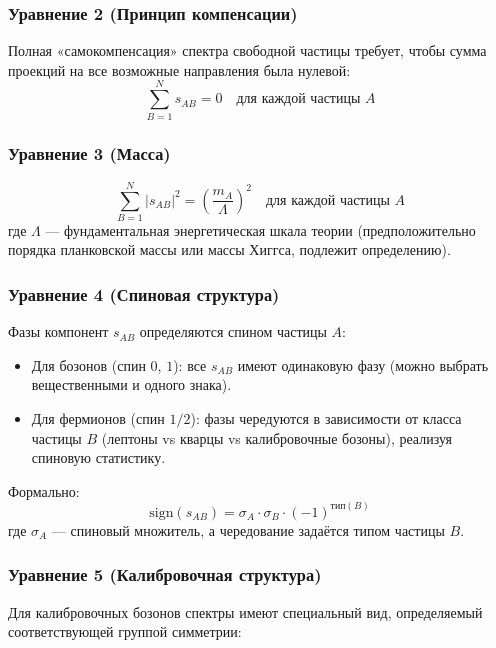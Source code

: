 \documentclass[12pt,a4paper]{article}
\begin{document}
\subsubsection{Уравнение 2 (Принцип компенсации)}
Полная «самокомпенсация» спектра свободной частицы требует, чтобы сумма проекций на все возможные направления была нулевой:
\begin{equation}
    \sum_{B=1}^{N} s_{AB} = 0 \quad \text{для каждой частицы } A
\end{equation}

\subsubsection{Уравнение 3 (Масса)}
\begin{equation}
    \sum_{B=1}^{N} |s_{AB}|^2 = \left( \frac{m_A}{\Lambda} \right)^2 \quad \text{для каждой частицы } A
\end{equation}
где $\Lambda$ --- фундаментальная энергетическая шкала теории (предположительно порядка планковской массы или массы Хиггса, подлежит определению).

\subsubsection{Уравнение 4 (Спиновая структура)}
Фазы компонент $s_{AB}$ определяются спином частицы $A$:

\begin{itemize}
    \item Для бозонов (спин $0$, $1$): все $s_{AB}$ имеют одинаковую фазу (можно выбрать вещественными и одного знака).
    \item Для фермионов (спин $1/2$): фазы чередуются в зависимости от класса частицы $B$ (лептоны vs кварцы vs калибровочные бозоны), реализуя спиновую статистику.
\end{itemize}

Формально:
\begin{equation}
    \text{sign}(s_{AB}) = \sigma_A \cdot \sigma_B \cdot (-1)^{\text{тип}(B)}
\end{equation}
где $\sigma_A$ --- спиновый множитель, а чередование задаётся типом частицы $B$.

\subsubsection{Уравнение 5 (Калибровочная структура)}
Для калибровочных бозонов спектры имеют специальный вид, определяемый соответствующей группой симметрии:
\end{document}
